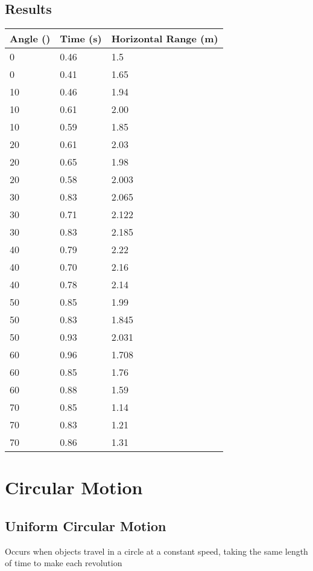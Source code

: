 	\subsection{Results}
		\begin{table}[htbp] \label{5.2 Table of Results}
			\centering
			\begin{tabular}{l|l|l}
				Angle (\textdegree) & Time (s)	& Horizontal Range (m)  \\ \hline
				0 					& 0.46		& 1.5 		\\
				0 					& 0.41		& 1.65		\\ \hline
				10					& 0.46		& 1.94		\\
				10					& 0.61		& 2.00		\\
				10					& 0.59		& 1.85		\\ \hline
				20					& 0.61		& 2.03		\\
				20					& 0.65		& 1.98		\\
				20					& 0.58		& 2.003		\\ \hline
				30					& 0.83		& 2.065		\\
				30					& 0.71		& 2.122		\\
				30					& 0.83		& 2.185		\\ \hline
				40					& 0.79		& 2.22		\\
				40					& 0.70		& 2.16		\\
				40					& 0.78		& 2.14		\\ \hline
				50					& 0.85		& 1.99		\\
				50					& 0.83		& 1.845		\\
				50					& 0.93		& 2.031		\\ \hline
				60					& 0.96		& 1.708		\\
				60					& 0.85		& 1.76		\\
				60					& 0.88		& 1.59		\\ \hline
				70					& 0.85		& 1.14		\\
				70					& 0.83		& 1.21		\\
				70					& 0.86		& 1.31		\\ \bottomrule
			\end{tabular}
		\end{table}


\section{Circular Motion} \label{4/11/2024}
\subsection{Uniform Circular Motion}
Occurs when objects travel in a circle at a constant speed, taking the same length of time to make each revolution

